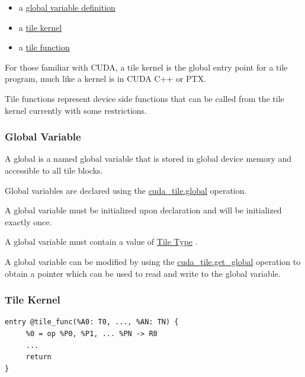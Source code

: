 \documentclass{article}
\begin{document}
\begin{itemize}
\item a \href{https://docs.nvidia.com/cuda/tile-ir/latest/sections/semantics.html#sub-sec-tile-global}{global variable definition}
\item a \href{https://docs.nvidia.com/cuda/tile-ir/latest/sections/semantics.html#sub-sec-tile-kernel}{tile kernel}
\item a \href{https://docs.nvidia.com/cuda/tile-ir/latest/sections/semantics.html#sub-sec-tile-function}{tile function}

\end{itemize}
For those familiar with CUDA, a tile kernel is the global entry point for a tile program, much like a kernel is in CUDA C++ or PTX.

Tile functions represent device side functions that can be called from the tile kernel currently with some restrictions.


\subsubsection{Global Variable}

A global is a named global variable that is stored in global device memory and accessible to all tile blocks.

Global variables are declared using the \href{https://docs.nvidia.com/cuda/tile-ir/latest/sections/operations.html#op-cuda-tile-global}{cuda\_tile.global} operation.

A global variable must be initialized upon declaration and will be initialized exactly once.


A global variable must contain a value of \href{https://docs.nvidia.com/cuda/tile-ir/latest/sections/types.html#type-tile}{Tile Type} .


A global variable can be modified by using the \href{https://docs.nvidia.com/cuda/tile-ir/latest/sections/operations.html#op-cuda-tile-get-global}{cuda\_tile.get\_global} operation to obtain a pointer which can be used to read and write to the global variable.



\subsubsection{Tile Kernel}

\begin{lstlisting}
entry @tile_func(%A0: T0, ..., %AN: TN) {
     %0 = op %P0, %P1, ... %PN -> R0
     ...
     return
}
\end{lstlisting}
\end{document}
